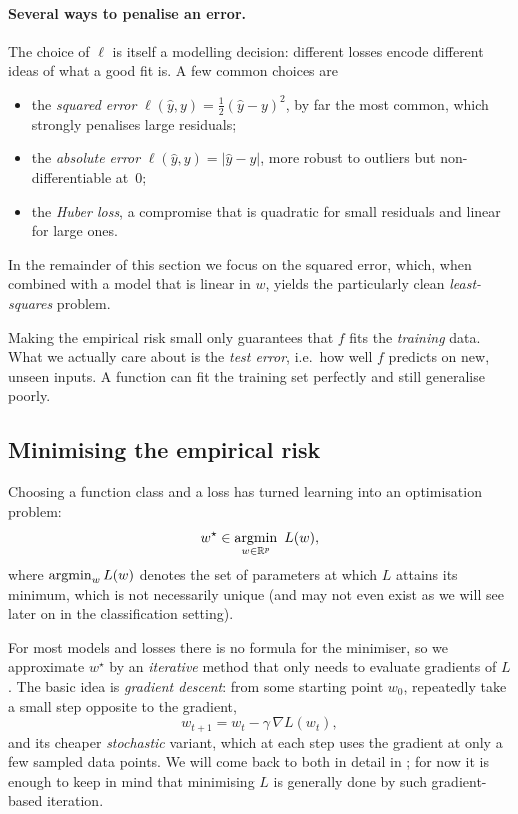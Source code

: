 \paragraph{Several ways to penalise an error.}
The choice of $\ell$ is itself a modelling decision: different losses encode
different ideas of what a good fit is. A few common choices are
\begin{itemize}
    \item the \emph{squared error} $\ell(\hat{y}, y) = \tfrac{1}{2}(\hat{y} - y)^2$,
    by far the most common, which strongly penalises large residuals;
    \item the \emph{absolute error} $\ell(\hat{y}, y) = |\hat{y} - y|$, more
    robust to outliers but non-differentiable at~$0$;
    \item the \emph{Huber loss}, a compromise that is quadratic for small
    residuals and linear for large ones.
\end{itemize}
In the remainder of this section we focus on the squared error, which, when
combined with a model that is linear in $w$, yields the particularly clean
\emph{least-squares} problem.

\begin{remark}
Making the empirical risk small only guarantees that $f$ fits the
\emph{training} data. What we actually care about is the \emph{test error},
i.e.\ how well $f$ predicts on new, unseen inputs. A function can fit the
training set perfectly and still generalise poorly.
\end{remark}


\subsection{Minimising the empirical risk}

Choosing a function class and a loss has turned learning into an optimisation
problem:
\[
w^\star \in \operatorname*{argmin}_{w \in \mathbb{R}^p} \ L(w),
\]
where $\operatorname*{argmin}_w L(w)$ denotes the set of parameters at which $L$
attains its minimum, which is not necessarily unique (and may not even exist as we will see later on in the classification setting).

For most models and losses there is no formula for the minimiser, so we
approximate $w^\star$ by an \emph{iterative} method that only needs to evaluate
gradients of $L$. The basic idea is \emph{gradient descent}: from some starting
point $w_0$, repeatedly take a small step opposite to the gradient,
\[
w_{t+1} = w_t - \gamma\, \nabla L(w_t),
\]
and its cheaper \emph{stochastic} variant, which at each step uses the gradient at
only a few sampled data points. We will come back to both in detail in
; for now it is enough to keep in mind that minimising $L$
is generally done by such gradient-based iteration.


